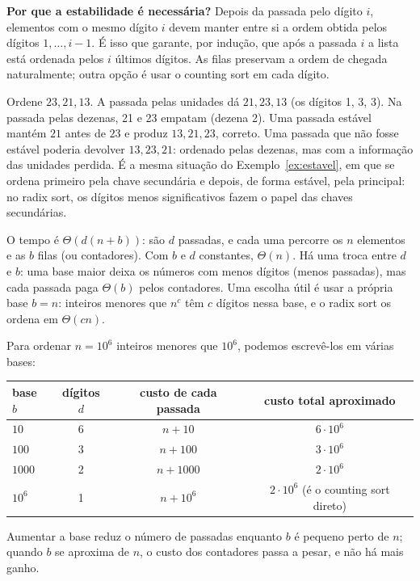 \textbf{Por que a estabilidade é necessária?} Depois da passada pelo dígito $i$, elementos com o mesmo dígito $i$ devem manter entre si a ordem obtida pelos dígitos $1,\dots,i-1$. É isso que garante, por indução, que após a passada $i$ a lista está ordenada pelos $i$ últimos dígitos. As filas preservam a ordem de chegada naturalmente; outra opção é usar o counting sort em cada dígito.

\begin{exemplo}\label{ex:semestab}
Ordene $23,21,13$. A passada pelas unidades dá $21,23,13$ (os dígitos 1, 3, 3). Na passada pelas dezenas, 21 e 23 empatam (dezena 2). Uma passada estável mantém $21$ antes de $23$ e produz $13,21,23$, correto. Uma passada que não fosse estável poderia devolver $13,23,21$: ordenado pelas dezenas, mas com a informação das unidades perdida. É a mesma situação do Exemplo~\ref{ex:estavel}, em que se ordena primeiro pela chave secundária e depois, de forma estável, pela principal: no radix sort, os dígitos menos significativos fazem o papel das chaves secundárias.
\end{exemplo}

O tempo é $\Theta(d(n+b))$: são $d$ passadas, e cada uma percorre os $n$ elementos e as $b$ filas (ou contadores). Com $b$ e $d$ constantes, $\Theta(n)$. Há uma troca entre $d$ e $b$: uma base maior deixa os números com menos dígitos (menos passadas), mas cada passada paga $\Theta(b)$ pelos contadores. Uma escolha útil é usar a própria base $b=n$: inteiros menores que $n^c$ têm $c$ dígitos nessa base, e o radix sort os ordena em $\Theta(cn)$.

\begin{exemplo}\label{ex:base}
Para ordenar $n=10^6$ inteiros menores que $10^6$, podemos escrevê-los em várias bases:
\begin{center}\small
\begin{tabular}{@{}lccc@{}}
\toprule
base $b$ & dígitos $d$ & custo de cada passada & custo total aproximado\\
\midrule
$10$ & 6 & $n+10$ & $6\cdot10^6$\\
$100$ & 3 & $n+100$ & $3\cdot10^6$\\
$1000$ & 2 & $n+1000$ & $2\cdot10^6$\\
$10^6$ & 1 & $n+10^6$ & $2\cdot10^6$ (é o counting sort direto)\\
\bottomrule
\end{tabular}
\end{center}
Aumentar a base reduz o número de passadas enquanto $b$ é pequeno perto de $n$; quando $b$ se aproxima de $n$, o custo dos contadores passa a pesar, e não há mais ganho.
\end{exemplo}

